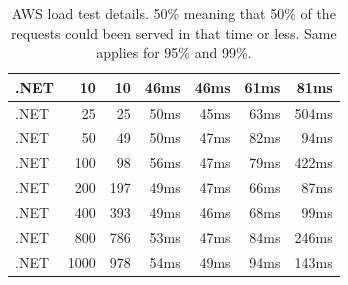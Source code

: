 \begin{table}[b]
\begin{tabular}{|l|r|r|r|r|r|r|}
.NET	&	10	&	10	&	46ms	&	46ms	&	61ms	&	81ms	\\ \hline
.NET	&	25	&	25	&	50ms	&	45ms	&	63ms	&	504ms	\\ \hline
.NET	&	50	&	49	&	50ms	&	47ms	&	82ms	&	94ms	\\ \hline
.NET	&	100	&	98	&	56ms	&	47ms	&	79ms	&	422ms	\\ \hline
.NET	&	200	&	197	&	49ms	&	47ms	&	66ms	&	87ms	\\ \hline
.NET	&	400	&	393	&	49ms	&	46ms	&	68ms	&	99ms	\\ \hline
.NET	&	800	&	786	&	53ms	&	47ms	&	84ms	&	246ms	\\ \hline
.NET	&	1000	&	978	&	54ms	&	49ms	&	94ms	&	143ms	\\ \hline
    \end{tabular}
    \caption[AWS load test details]{AWS load test details. 50\% meaning that 50\% of the requests could been served in that time or less. Same applies for 95\% and 99\%.}
    \label{table:aws_load_test}
\end{table}

